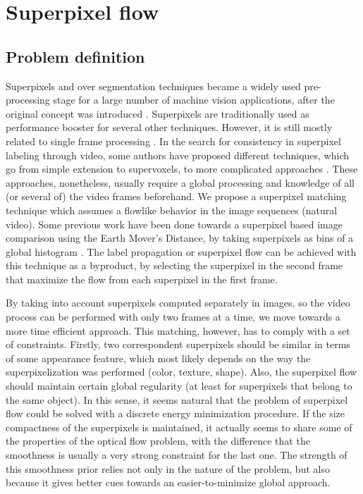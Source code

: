 \section{Superpixel flow}
\label{sec:suppix}

\subsection{Problem definition}
Superpixels and over segmentation techniques became a widely used pre-processing
 stage for a large number of machine vision applications, after the
original concept was introduced \cite{c1}. Superpixels are traditionally used as 
performance booster for several other techniques. However, it is still mostly related to
single frame processing \cite{c1}\cite{c10}\cite{c11}. In the search for
consistency in superpixel labeling through video, some authors have proposed different 
techniques, which go from simple extension to supervoxels\cite{c9}\cite{c11},
to more complicated approaches \cite{c8}. These approaches, nonetheless, usually require a 
global processing and knowledge of all (or several of) the video frames beforehand. 
We propose a superpixel matching technique which assumes a flowlike behavior in the image 
sequences (natural video). Some previous work have been done towards a
superpixel based image comparison using the Earth Mover's Distance, by taking superpixels 
as bins of a global histogram \cite{c2}. The label propagation or superpixel flow can be
achieved with this technique as a byproduct, by selecting the superpixel in the second frame that 
maximize the flow from each superpixel in the first frame.

By taking into account superpixels computed separately in images, so the video process can be 
performed with only two frames at a time, we move towards a more time efficient approach. 
This matching, however, has to comply with a set of constraints. 
Firstly, two correspondent superpixels should be similar in terms of some appearance
feature, which most likely depends on the way the superpixelization was performed (color, texture,
shape). Also, the superpixel flow  should maintain certain global regularity (at least for
superpixels that belong to the same object). In this sense, it seems
natural that the problem of superpixel flow could be solved with a discrete energy minimization
procedure. If the size compactness of the superpixels is maintained,  it actually seems to 
share some of the properties of the optical flow problem, with the difference that the
smoothness is usually a very strong constraint for the last one. 
The strength of this smoothness prior relies not only in the nature of the problem, but also
because it gives better cues towards an easier-to-minimize global approach.

